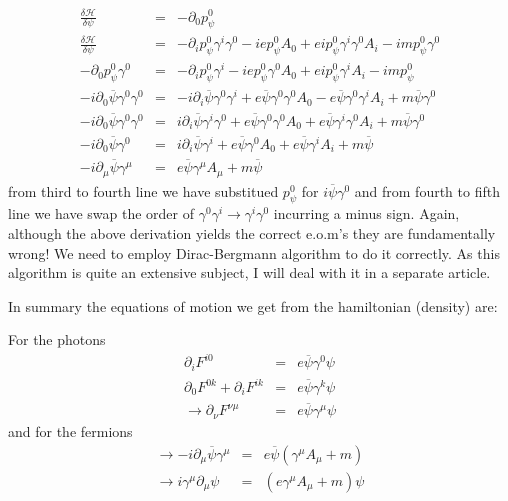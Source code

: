 \documentclass[aps,preprint,preprintnumbers,nofootinbib,showpacs,prd]{revtex4-1}
\newcommand{\nbea}{\begin{eqnarray*}}
\newcommand{\neea}{\end{eqnarray*}}
\begin{document}
%
\nbea
\frac{\delta \mathcal{H}}{\delta \psi} & = & -\partial_0 p^0_\psi \\
\frac{\delta \mathcal{H}}{\delta \psi} & = & -\partial_i p^0_{\psi} \gamma^i \gamma^0 - i e p^0_\psi A_0 + e i p^0_{\psi}\gamma^i  \gamma^0  A_i - i m p^0_{\psi} \gamma^0 \\
-\partial_0 p^0_\psi \gamma^0 & = & -\partial_i p^0_{\psi} \gamma^i - i e p^0_\psi \gamma^0 A_0  + e i p^0_{\psi} \gamma^i A_i - i m p^0_{\psi} \\
-i \partial_0 \overline \psi \gamma^0 \gamma^0 & = & - i\partial_i \overline \psi \gamma^0 \gamma^i + e \overline \psi \gamma^0 \gamma^0 A_0 - e \overline \psi \gamma^0 \gamma^i A_i + m \overline \psi \gamma^0 \\
-i \partial_0 \overline \psi \gamma^0 \gamma^0 & = & i\partial_i \overline \psi \gamma^i \gamma^0 + e \overline \psi \gamma^0 \gamma^0 A_0 + e \overline \psi \gamma^i \gamma^0 A_i + m \overline \psi \gamma^0 \\
-i \partial_0 \overline \psi \gamma^0 & = & i\partial_i \overline \psi \gamma^i + e \overline \psi \gamma^0 A_0 + e \overline \psi \gamma^i A_i + m \overline \psi \\
-i \partial_\mu \overline \psi \gamma^\mu & = & e \overline \psi \gamma^\mu A_\mu + m \overline \psi
\neea
%
from third to fourth line we have substitued $p^0_{\psi}$ for $i \overline \psi \gamma^0$ and from fourth to fifth line we have swap the order of $\gamma^0 \gamma^i \to \gamma^i \gamma^0$ incurring a minus sign. Again, although the above derivation yields the correct e.o.m's they are fundamentally wrong! We need to employ Dirac-Bergmann algorithm to do it correctly. As this algorithm is quite an extensive subject, I will deal with it in a separate article.

In summary the equations of motion we get from the hamiltonian (density) are:

For the photons
%
\nbea
\partial_i F^{i 0} & = & e \overline \psi \gamma^0 \psi \\
\partial_0 F^{0 k} + \partial_i F^{ik} & = & e \overline \psi \gamma^k \psi \\
\rightarrow \partial_\nu F^{\nu\mu} & = & e \overline \psi \gamma^\mu \psi 
\neea
%
and for the fermions
%
\nbea
\rightarrow -  i \partial_\mu \overline \psi \gamma^\mu & = & e \overline \psi (\gamma^\mu A_\mu + m ) \\
\rightarrow i \gamma^\mu \partial_\mu \psi & = & (e \gamma^\mu A_\mu + m) \psi
\neea
%
\end{document}
